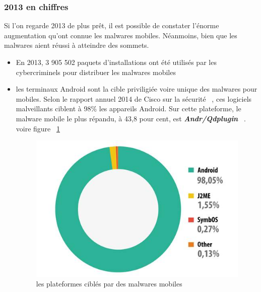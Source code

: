 \subsubsection{2013 en chiffres}
Si l’on regarde 2013 de plus prêt, il est possible de constater l’énorme augmentation qu’ont connue les malwares mobiles. Néanmoins, bien que les malwares aient réussi à atteindre des sommets.
\begin{itemize}
\item En 2013, 3 905 502 paquets d’installations ont été utilisés par les cybercriminels pour distribuer les malwares mobiles
\item  les terminaux Android sont la cible priviligiée voire unique des malwares pour mobiles. Selon le rapport annuel 2014 de Cisco sur la sécurité ~\cite{cisco}, ces logiciels malveillants ciblent à 98\% les appareils Android. Sur cette plateforme, le malware mobile le plus répandu, à 43,8 pour cent, est \textbf{\textit{Andr/Qdplugin}} ~\cite{cisco}. voire figure ~\ref{fig :mobile}
\begin{figure}[H]
\begin{center}
\includegraphics[scale=0.7]{Figures/mobile.jpg}
\caption{les plateformes ciblés par des malwares mobiles}
\label{fig :mobile} 
\end{center}
\end{figure}


\end{itemize}
